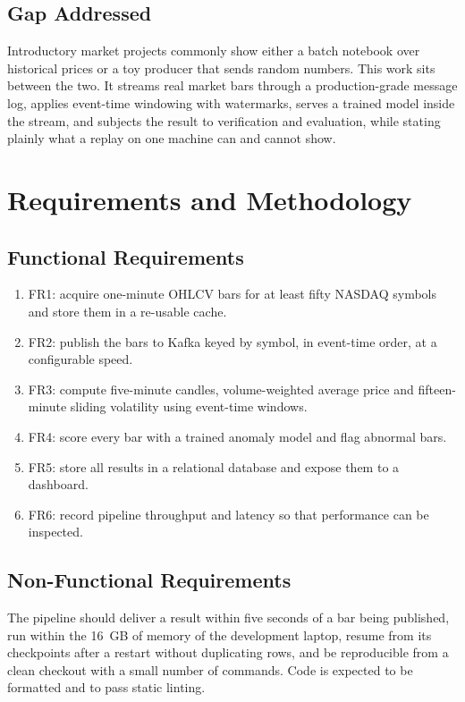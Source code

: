\documentclass[conference]{IEEEtran}
\begin{document}
\subsection{Gap Addressed}
Introductory market projects commonly show either a batch notebook over historical prices or a toy producer that sends random numbers. This work sits between the two. It streams real market bars through a production-grade message log, applies event-time windowing with watermarks, serves a trained model inside the stream, and subjects the result to verification and evaluation, while stating plainly what a replay on one machine can and cannot show.

\section{Requirements and Methodology}

\subsection{Functional Requirements}
\begin{enumerate}
\item FR1: acquire one-minute OHLCV bars for at least fifty NASDAQ symbols and store them in a re-usable cache.
\item FR2: publish the bars to Kafka keyed by symbol, in event-time order, at a configurable speed.
\item FR3: compute five-minute candles, volume-weighted average price and fifteen-minute sliding volatility using event-time windows.
\item FR4: score every bar with a trained anomaly model and flag abnormal bars.
\item FR5: store all results in a relational database and expose them to a dashboard.
\item FR6: record pipeline throughput and latency so that performance can be inspected.
\end{enumerate}

\subsection{Non-Functional Requirements}
The pipeline should deliver a result within five seconds of a bar being published, run within the 16~GB of memory of the development laptop, resume from its checkpoints after a restart without duplicating rows, and be reproducible from a clean checkout with a small number of commands. Code is expected to be formatted and to pass static linting.
\end{document}
